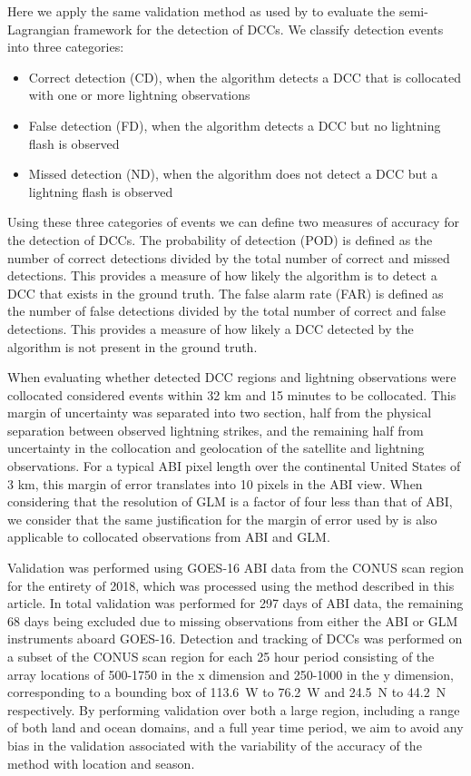 \documentclass[amt, manuscript]{copernicus}
\begin{document}
Here we apply the same validation method as used by \citet{muller_novel_2019} to evaluate the semi-Lagrangian framework for the detection of DCCs.
We classify detection events into three categories:

\begin{itemize}
    \item Correct detection (CD), when the algorithm detects a DCC that is collocated with one or more lightning observations
    \item False detection (FD), when the algorithm detects a DCC but no lightning flash is observed
    \item Missed detection (ND), when the algorithm does not detect a DCC but a lightning flash is observed
\end{itemize}

Using these three categories of events we can define two measures of accuracy for the detection of DCCs.
The probability of detection (POD) is defined as the number of correct detections divided by the total number of correct and missed detections.
This provides a measure of how likely the algorithm is to detect a DCC that exists in the ground truth.
The false alarm rate (FAR) is defined as the number of false detections divided by the total number of correct and false detections.
This provides a measure of how likely a DCC detected by the algorithm is not present in the ground truth.

When evaluating whether detected DCC regions and lightning observations were collocated \citet{muller_novel_2019} considered events within 32 \unit{km} and 15 minutes to be collocated.
This margin of uncertainty was separated into two section, half from the physical separation between observed lightning strikes, and the remaining half from uncertainty in the collocation and geolocation of the satellite and lightning observations.
For a typical ABI pixel length over the continental United States of 3 \unit{km}, this margin of error translates into 10 pixels in the ABI view.
When considering that the resolution of GLM is a factor of four less than that of ABI, we consider that the same justification for the margin of error used by \citet{muller_novel_2019} is also applicable to collocated observations from ABI and GLM.

Validation was performed using GOES-16 ABI data from the CONUS scan region for the entirety of 2018, which was processed using the method described in this article.
In total validation was performed for 297 days of ABI data, the remaining 68 days being excluded due to missing observations from either the ABI or GLM instruments aboard GOES-16.
Detection and tracking of DCCs was performed on a subset of the CONUS scan region for each 25 hour period consisting of the array locations of 500-1750 in the x dimension and 250-1000 in the y dimension, corresponding to a bounding box of 113.6~\degree W to 76.2~\degree W and 24.5~\degree N to 44.2~\degree N respectively.
By performing validation over both a large region, including a range of both land and ocean domains, and a full year time period, we aim to avoid any bias in the validation associated with the variability of the accuracy of the method with location and season.
\end{document}
